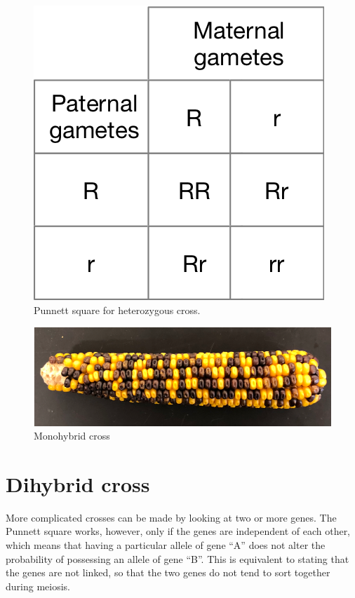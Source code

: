 \begin{figure}

{\centering \includegraphics[width=0.7\linewidth]{./figures/mendel/PunnettF1} 

}

\caption{Punnett square for heterozygous cross.}\label{fig:punnettF1}
\end{figure}

\begin{figure}

{\centering \includegraphics[width=0.7\linewidth]{./figures/mendel/Monohybrid_cross} 

}

\caption{Monohybrid cross}\label{fig:monohybrid}
\end{figure}

\hypertarget{dihybrid-cross}{%
\section{Dihybrid cross}\label{dihybrid-cross}}

More complicated crosses can be made by looking at two or more genes. The Punnett square works, however, only if the genes are independent of each other, which means that having a particular allele of gene ``A'' does not alter the probability of possessing an allele of gene ``B''. This is equivalent to stating that the genes are not linked, so that the two genes do not tend to sort together during meiosis.

